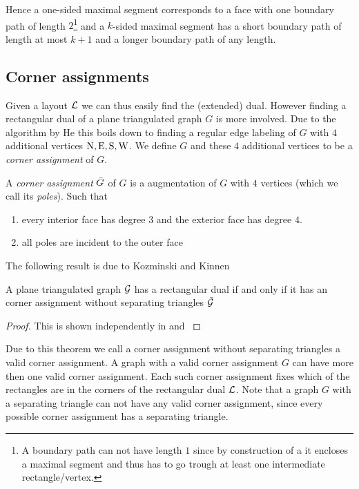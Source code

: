     Hence a one-sided maximal segment corresponds to a face with one boundary path of length $2$\footnote{A boundary path can not have length $1$ since by construction of a \rel it encloses a maximal segment and thus has to go trough at least one intermediate rectangle/vertex.} and a $k$-sided maximal segment has a short boundary path of length at most $k+1$ and a longer boundary path of any length.

\subsection{Corner assignments}

  Given a layout $\mathcal{L}$ we can thus easily find the (extended) dual. However finding a rectangular dual of a plane triangulated graph $G$ is more involved. Due to the algorithm by He \cite{He1993} this boils down to finding a regular edge labeling of $G$ with $4$ additional vertices $\mathrm{N}, \mathrm{E}, \mathrm{S}, \mathrm{W}$. We define $G$ and these $4$ additional vertices to be a \emph{corner assignment} of $G$.

  \begin{defi}
    A \emph{corner assignment} $\bar{G}$ of $G$ is a augmentation of $G$ with $4$ vertices (which we call its \emph{poles}). Such that
    \begin{enumerate}
    \item every interior face has degree $3$ and the exterior face has degree $4$.
    \item all poles are incident to the outer face
    \end{enumerate}
  \end{defi}

  The following result is due to Kozminski and Kinnen

  \begin{thrm}
    \label{th:rect:exsitenceREctangularDual}
    A plane triangulated graph $\mathcal{G}$ has a rectangular dual if and only if it has an corner assignment without separating triangles $\bar{\mathcal{G}}$
  \end{thrm}

  \begin{proof}
    This is shown independently in \cite{Kozminski1984} and  \cite{Ungar1953}
  \end{proof}

  Due to this theorem we call a corner assignment without separating triangles a valid corner assignment.
  A graph with a valid corner assignment $G$ can have more then one valid corner assignment. Each such corner assignment fixes which of the rectangles are in the corners of the rectangular dual $\mathcal{L}$.
  Note that a graph $G$ with a separating triangle can not have any valid corner assignment, since every possible corner assignment has a separating triangle.

